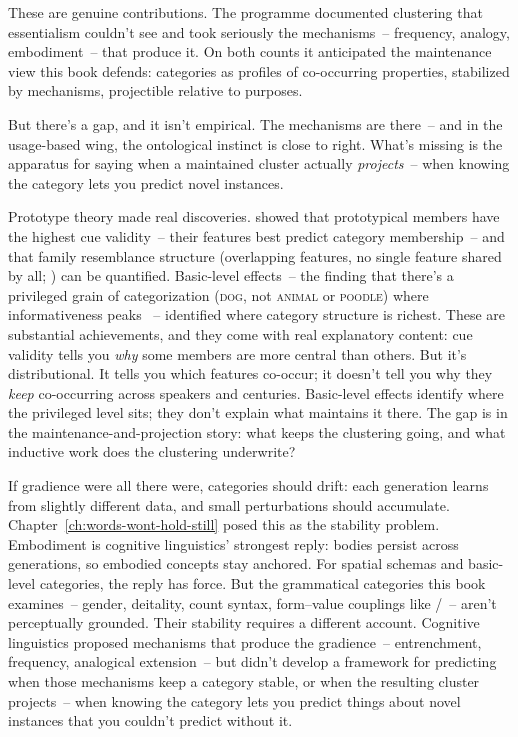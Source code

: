 These are genuine contributions. The programme documented clustering that essentialism couldn't see and took seriously the mechanisms~-- frequency, analogy, embodiment~-- that produce it. On both counts it anticipated the maintenance view this book defends: categories as profiles of co-occurring properties, stabilized by mechanisms, projectible relative to purposes.

But there's a gap, and it isn't empirical. The mechanisms are there~-- and in the usage-based wing, the ontological instinct is close to right. What's missing is the apparatus for saying when a maintained cluster actually \emph{projects}~-- when knowing the category lets you predict novel instances.

Prototype theory made real discoveries. \textcite{roschmervis1975} showed that prototypical members have the highest cue validity~-- their features best predict category membership~-- and that family resemblance structure (overlapping features, no single feature shared by all; \citealp{wittgenstein1953}) can be quantified. Basic-level effects~-- the finding that there's a privileged grain of categorization (\textsc{dog}, not \textsc{animal} or \textsc{poodle}) where informativeness peaks \citep{rosch1976}~-- identified where category structure is richest. These are substantial achievements, and they come with real explanatory content: cue validity tells you \emph{why} some members are more central than others. But it's distributional. It tells you which features co-occur; it doesn't tell you why they \emph{keep} co-occurring across speakers and centuries. Basic-level effects identify where the privileged level sits; they don't explain what maintains it there. The gap is in the maintenance-and-projection story: what keeps the clustering going, and what inductive work does the clustering underwrite?

If gradience were all there were, categories should drift: each generation learns from slightly different data, and small perturbations should accumulate. Chapter~\ref{ch:words-wont-hold-still} posed this as the stability problem. Embodiment is cognitive linguistics' strongest reply: bodies persist across generations, so embodied concepts stay anchored. For spatial schemas and basic-level categories, the reply has force. But the grammatical categories this book examines~-- gender, deitality, count syntax, form--value couplings like /~-- aren't perceptually grounded. Their stability requires a different account. Cognitive linguistics proposed mechanisms that produce the gradience~-- entrenchment, frequency, analogical extension~-- but didn't develop a framework for predicting when those mechanisms keep a category stable, or when the resulting cluster projects~-- when knowing the category lets you predict things about novel instances that you couldn't predict without it.

